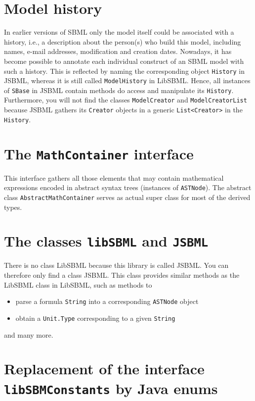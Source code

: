 \documentclass[
  letterpaper,
  12pt,
  headsepline,
  pointlessnumbers,
  tablecaptionabove,
  headinclude,
  appendixprefix,
  idxtotoc,
  bibtotoc
]{scrartcl}
\begin{document}
\section{Model history}

In earlier versions of SBML only the model itself could be associated with a
history, i.e., a description about the person(s) who build this model, including
names, e-mail addresses, modification and creation dates. Nowadays, it has
become possible to annotate each individual construct of an SBML model with such
a history. This is reflected by naming the corresponding object \verb!History!
in JSBML, whereas it is still called \verb!ModelHistory! in LibSBML. Hence, all
instances of \verb!SBase! in JSBML contain methods do access and manipulate its
\verb!History!. Furthermore, you will not find the classes \verb!ModelCreator!
and \verb!ModelCreatorList! because JSBML gathers its \verb!Creator! objects
in a generic \verb!List<Creator>! in the \verb!History!.

\section{The \texttt{MathContainer} interface}

This interface gathers all those elements that may contain mathematical
expressions encoded in abstract syntax trees (instances of \verb!ASTNode!).
The abstract class \verb!AbstractMathContainer! serves as actual super class
for most of the derived types.
 

\section{The classes \texttt{libSBML} and \texttt{JSBML}}

There is no class LibSBML because this library is called JSBML. You
can therefore only find a class JSBML. This class provides similar
methods as the LibSBML class in LibSBML, such as methods to
\begin{itemize}
 \item parse a formula \verb!String! into a corresponding \verb!ASTNode! object
 \item obtain a \verb!Unit.Type! corresponding to a given \verb!String!
\end{itemize}
and many more.


\section{Replacement of the interface \texttt{libSBMConstants} by Java enums}
\end{document}
